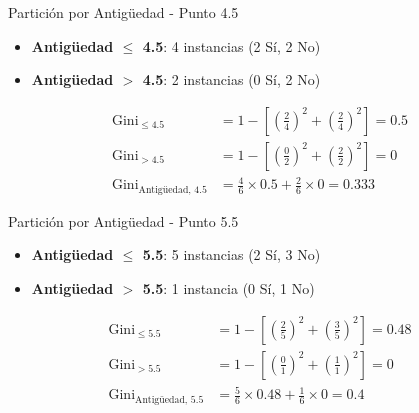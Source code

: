 \documentclass{beamer}
\begin{document}
\begin{frame}{Partición por Antigüedad - Punto 4.5}
    \begin{itemize}
        \item \textbf{Antigüedad $\leq$ 4.5}: 4 instancias (2 Sí, 2 No)
        \item \textbf{Antigüedad $>$ 4.5}: 2 instancias (0 Sí, 2 No)
    \end{itemize}
    
    \vspace{0.5em}
    
    \begin{align*}
        \mathrm{Gini}_{\leq 4.5} &= 1 - \left[\left(\tfrac{2}{4}\right)^2 + \left(\tfrac{2}{4}\right)^2\right] = 0.5 \\
        \mathrm{Gini}_{> 4.5} &= 1 - \left[\left(\tfrac{0}{2}\right)^2 + \left(\tfrac{2}{2}\right)^2\right] = 0 \\
        \mathrm{Gini}_{\text{Antigüedad, 4.5}} &= \tfrac{4}{6}\times0.5 + \tfrac{2}{6}\times0 = 0.333
    \end{align*}
\end{frame}

\begin{frame}{Partición por Antigüedad - Punto 5.5}
    \begin{itemize}
        \item \textbf{Antigüedad $\leq$ 5.5}: 5 instancias (2 Sí, 3 No)
        \item \textbf{Antigüedad $>$ 5.5}: 1 instancia (0 Sí, 1 No)
    \end{itemize}
    
    \vspace{0.5em}
    
    \begin{align*}
        \mathrm{Gini}_{\leq 5.5} &= 1 - \left[\left(\tfrac{2}{5}\right)^2 + \left(\tfrac{3}{5}\right)^2\right] = 0.48 \\
        \mathrm{Gini}_{> 5.5} &= 1 - \left[\left(\tfrac{0}{1}\right)^2 + \left(\tfrac{1}{1}\right)^2\right] = 0 \\
        \mathrm{Gini}_{\text{Antigüedad, 5.5}} &= \tfrac{5}{6}\times0.48 + \tfrac{1}{6}\times0 = 0.4
    \end{align*}
\end{frame}
\end{document}

